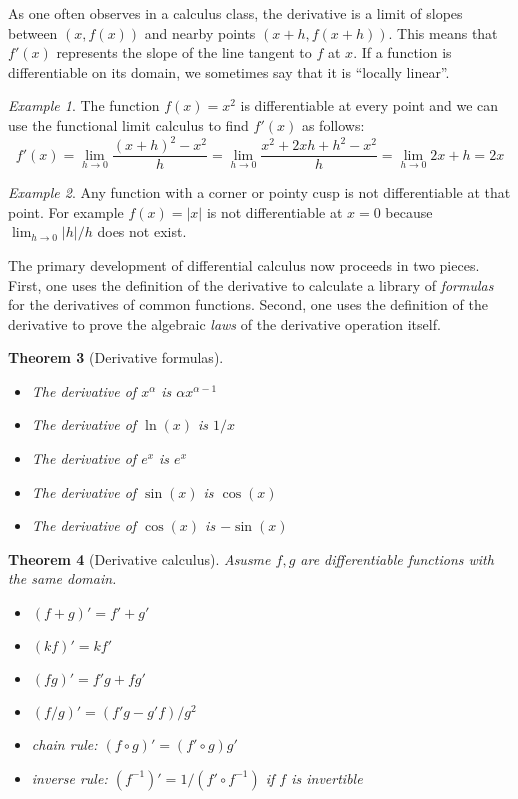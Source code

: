 \documentclass[11pt,oneside]{amsbook}
\theoremstyle{definition}
\theoremstyle{plain}
\newtheorem{theorem}{Theorem}[section]
\theoremstyle{definition}
\theoremstyle{remark}
\newtheorem{example}[theorem]{Example}
\numberwithin{equation}{section}
\numberwithin{figure}{section}
\begin{document}
As one often observes in a calculus class, the derivative is a limit of slopes between $(x,f(x))$ and nearby points $(x+h,f(x+h))$. This means that $f'(x)$ represents the slope of the line tangent to $f$ at $x$. If a function is differentiable on its domain, we sometimes say that it is ``locally linear''.

\begin{example}
  The function $f(x)=x^2$ is differentiable at every point and we can use the functional limit calculus to find $f'(x)$ as follows:
  \[f'(x)=\lim_{h\to0}\frac{(x+h)^2-x^2}{h}
  =\lim_{h\to0}\frac{x^2+2xh+h^2-x^2}{h}=\lim_{h\to0}2x+h=2x
  \]
\end{example}

\begin{example}
  Any function with a corner or pointy cusp is not differentiable at that point. For example $f(x)=|x|$ is not differentiable at $x=0$ because $\lim_{h\to0}|h|/h$ does not exist.
\end{example}

The primary development of differential calculus now proceeds in two pieces. First, one uses the definition of the derivative to calculate a library of \emph{formulas} for the derivatives of common functions. Second, one uses the definition of the derivative to prove the algebraic \emph{laws} of the derivative operation itself.

\begin{theorem}[Derivative formulas]
  \begin{itemize}
    \item The derivative of $x^\alpha$ is $\alpha x^{\alpha-1}$
    \item The derivative of $\ln(x)$ is $1/x$
    \item The derivative of $e^x$ is $e^x$
    \item The derivative of $\sin(x)$ is $\cos(x)$
    \item The derivative of $\cos(x)$ is $-\sin(x)$
  \end{itemize}
\end{theorem}

\begin{theorem}[Derivative calculus]
  Asusme $f,g$ are differentiable functions with the same domain.
  \begin{itemize}
    \item $(f+g)'=f'+g'$
    \item $(kf)'=kf'$
    \item $(fg)'=f'g+fg'$
    \item $(f/g)'=(f'g-g'f)/g^2$
    \item chain rule: $(f\circ g)'=(f'\circ g)g'$
    \item inverse rule: $(f^{-1})'=1/(f'\circ f^{-1})$ if $f$ is invertible
  \end{itemize}
\end{theorem}
\end{document}

